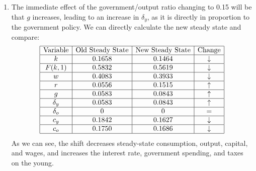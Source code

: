 \documentclass[10pt]{article}
\begin{document}
\begin{enumerate}
	\item The immediate effect of the government/output ratio changing to 0.15 will be that $g$ increases, leading to an increase in $\delta_y$, as it is directly in proportion to the government policy. We can directly calculate the new steady state and compare: \[ \begin{array}{|c|c|c|c|} \hline \text{Variable} &\text{Old Steady State} & \text{New Steady State} & \text{Change} \\\hline k & 0.1658 & 0.1464 & \downarrow \\\hline F(k,1) & 0.5832 & 0.5619& \downarrow \\\hline w & 0.4083 & 0.3933& \downarrow \\\hline r & 0.0556 & 0.1515& \uparrow \\\hline g & 0.0583 & 0.0843& \uparrow \\\hline \delta_y & 0.0583 & 0.0843& \uparrow \\\hline \delta_o & 0 & 0 & =\\\hline c_y & 0.1842 & 0.1627 & \downarrow \\\hline c_o & 0.1750 & 0.1686 & \downarrow \\\hline \end{array}\]As we can see, the shift decreases steady-state consumption, output, capital, and wages, and increases the interest rate, government spending, and taxes on the young.

\end{enumerate}
\end{document}
